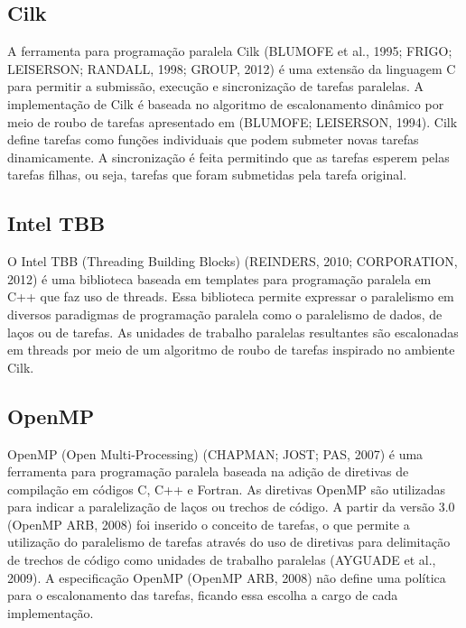\subsection{Cilk}

A ferramenta para programação paralela Cilk (BLUMOFE et al., 1995; FRIGO; LEISERSON; RANDALL, 1998; GROUP, 2012) é uma extensão da linguagem C para permitir a submissão, execução e sincronização de tarefas paralelas. A implementação de Cilk é baseada no algoritmo de escalonamento dinâmico por meio de roubo de tarefas apresentado em (BLUMOFE; LEISERSON, 1994). Cilk define tarefas como funções individuais que podem submeter novas tarefas dinamicamente. A sincronização é feita permitindo que as tarefas esperem pelas tarefas filhas, ou seja, tarefas que foram submetidas pela tarefa original.


\subsection{Intel TBB}

O Intel TBB (Threading Building Blocks) (REINDERS, 2010; CORPORATION, 2012) é uma biblioteca baseada em templates para programação paralela em C++ que faz uso de threads. Essa biblioteca permite expressar o paralelismo em diversos paradigmas de programação paralela como o paralelismo de dados, de laços ou de tarefas. As unidades de trabalho paralelas resultantes são escalonadas em threads por meio de um algoritmo de roubo de tarefas inspirado no ambiente Cilk.

\subsection{OpenMP}

OpenMP (Open Multi-Processing) (CHAPMAN; JOST; PAS, 2007) é uma ferramenta para programação paralela baseada na adição de diretivas de compilação em códigos C, C++ e Fortran. As diretivas OpenMP são utilizadas para indicar a paralelização de laços ou trechos de código. A partir da versão 3.0 (OpenMP ARB, 2008) foi inserido o conceito de tarefas, o que permite a utilização do paralelismo de tarefas através do uso de diretivas para delimitação de trechos de código como unidades de trabalho paralelas (AYGUADE et al., 2009). A especificação OpenMP (OpenMP ARB, 2008) não define uma política para o escalonamento das tarefas, ficando essa escolha a cargo de cada implementação.
